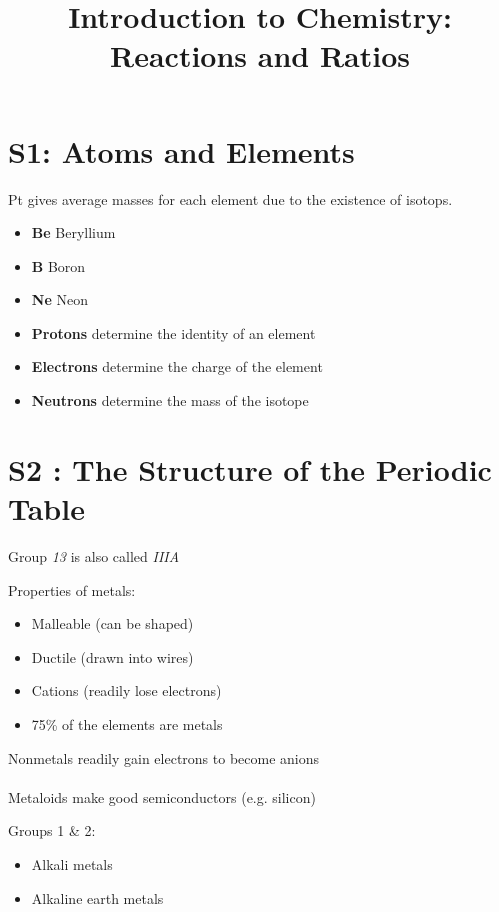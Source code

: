 \documentclass[12pt]{article}
\title{Introduction to Chemistry: Reactions and Ratios}
\begin{document}
\maketitle

\section{S1: Atoms and Elements}

Pt gives average masses for each element due to the existence of isotops. 

\begin{itemize}
\item \textbf{Be} Beryllium
\item \textbf{B} Boron
\item \textbf{Ne} Neon
\end{itemize}

\vspace{15mm}

\begin{itemize}
\item \textbf{Protons} determine the identity of an element
\item \textbf{Electrons} determine the charge of the element
\item \textbf{Neutrons} determine the mass of the isotope
\end{itemize}

\section{S2 : The Structure of the Periodic Table}

Group \emph{13} is also called \emph{IIIA}
 

Properties of metals:
\begin{itemize}
\item Malleable (can be shaped)
\item Ductile (drawn into wires)
\item Cations (readily lose electrons)
\item 75\% of the elements are metals
\end{itemize}

Nonmetals readily gain electrons to become anions\\
\\
Metaloids make good semiconductors (e.g. silicon)

Groups 1 \& 2:
\begin{itemize}
\item Alkali metals
\item Alkaline earth metals
\end{itemize}
\end{document}
